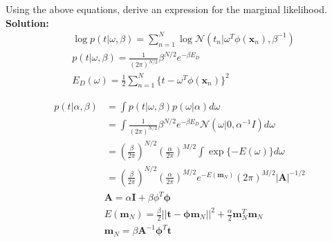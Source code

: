 \documentclass{article}
\begin{document}
Using the above equations, derive an expression for the marginal likelihood. \\
\textbf{Solution:} \\
\begin{equation}
\begin{aligned}
& \log p(t|\omega,\beta) = \sum_{n=1}^{N} \log \mathcal{N}(t_{n}|\omega^{T}\phi(\mathbf{x}_{n}),\beta^{-1}) \\
& p(t|\omega,\beta) = \frac{1}{(2\pi)^{N/2}} \beta^{N/2}e^{-\beta E_{D}} \\
& E_{D}(\omega) = \frac{1}{2}\sum_{n=1}^{N}\{t -\omega^{T}\phi(\mathbf{x}_{n})\}^{2}
\end{aligned}
\end{equation}

\begin{equation}
\begin{aligned}
    p(t|\alpha,\beta) & = \int p(t|\omega, \beta)p(\omega | \alpha) d\omega \\
    & = \int \frac{1}{(2\pi)^{N/2}} \beta^{N/2}e^{-\beta E_{D}} \mathcal{N}(\omega|0,\alpha^{-1} I)d\omega  \\
    & = (\frac{\beta}{2\pi})^{N/2}(\frac{\alpha}{2\pi})^{M/2}\int \exp\{-E(\omega)\}d\omega \\
    & = (\frac{\beta}{2\pi})^{N/2}(\frac{\alpha}{2\pi})^{M/2} e^{-E(\mathbf{m}_N)} (2\pi)^{M/2}|\mathbf{A}|^{-1/2}
\end{aligned}
\end{equation}
\begin{equation}
\begin{aligned}
& \mathbf{A} = \alpha \mathbf{I} + \beta \phi^{T}\mathbf{\phi} \\
& E(\mathbf{m}_{N}) = \frac{\beta}{2} ||\mathbf{t}-\mathbf{\phi} \mathbf{m}_{N}||^2 + \frac{\alpha}{2} \mathbf{m}_{N}^{T} \mathbf{m}_{N} \\
& \mathbf{m}_N = \beta \mathbf{A}^{-1}\mathbf{\phi}^{T}\mathbf{t}
\end{aligned}
\end{equation}
\end{document}
